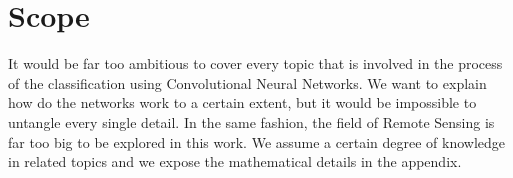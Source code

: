 \section{Scope}

It would be far too ambitious to cover every topic that is involved in the process of the classification using Convolutional Neural Networks. We want to explain how do the networks work to a certain extent, but it would be impossible to untangle every single detail. In the same fashion, the field of Remote Sensing is far too big to be explored in this work. We assume a certain degree of knowledge in related topics and we expose the mathematical details in the appendix.\\
